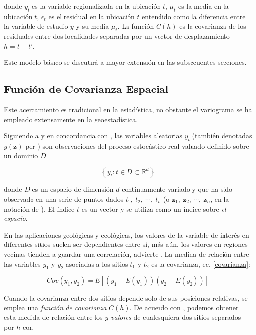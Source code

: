 \documentclass[14pt]{extarticle}
\begin{document}
\noindent donde $y_t$ es la variable regionalizada en la ubicación $t$, $\mu_t$ es la media en la ubicación $t$, $\epsilon_t$ es el residual en la ubicación $t$ entendido como la diferencia entre la variable de estudio $y$ y su media $\mu_t$. La función $C(h)$ es la covarianza de los residuales entre dos localidades separadas por un vector de desplazamiento $h = t - t'$. 

Este modelo básico se discutirá a mayor extensión en las subsecuentes secciones. 
 
\subsection{Función de Covarianza Espacial}
Este acercamiento es tradicional en la estadística\cite{Thompson.2012}, no obstante el variograma se ha empleado extensamente en la geoestadística\cite{Cressie.1986, Thompson.2012, Brus.2022}. 

Siguiendo a \cite{Benedetti.2015} y en concordancia con \cite{Cressie.1986}, las variables aleatorias $y_t$ (también denotadas $y(\mathbf{z})$ por \cite{Benedetti.2015}) son observaciones del proceso estocástico real-valuado definido sobre un dominio $D$

\begin{equation}
	\left\lbrace y_t : t \in D \subset \mathbb{R}^d \right\rbrace\label{proceso}
\end{equation}

\noindent donde $D$ es un espacio de dimensión $d$ continuamente variado y que ha sido observado en una serie de puntos dados $t_1,\ t_2,\ \cdots,\ t_n$ (o $\mathbf{z}_1,\ \mathbf{z}_2,\ \cdots,\ \mathbf{z}_n$, en la notación de \cite{Benedetti.2015}). El índice $t$ es un vector y se utiliza como un índice sobre \textit{el espacio}\cite{Cressie.1986}. 

En las aplicaciones geológicas y ecológicas, los valores de la variable de interés en diferentes sitios suelen ser dependientes entre sí, más aún, los valores en regiones vecinas tienden a guardar una correlación, advierte \cite{Thompson.2012}. La medida de relación entre las variables $y_1$ y $y_2$ asociadas a los sitios $t_1$ y $t_2$ es la covarianza, ec. \ref{covarianza}: 

\begin{equation}
	Cov(y_1, y_2) = E\left[\left(y_1 - E(y_1)\right)\left(y_2 - E(y_2)\right)\right]\label{covarianza}
\end{equation}

Cuando la covarianza entre dos sitios depende solo de sus posiciones relativas, se emplea una \textit{función de covarianza} $C(h)$. De acuerdo con \cite{Thompson.2012}, podemos obtener esta medida de relación entre los \textit{$y$-valores} de cualesquiera dos sitios separados por $h$ con
\end{document}
